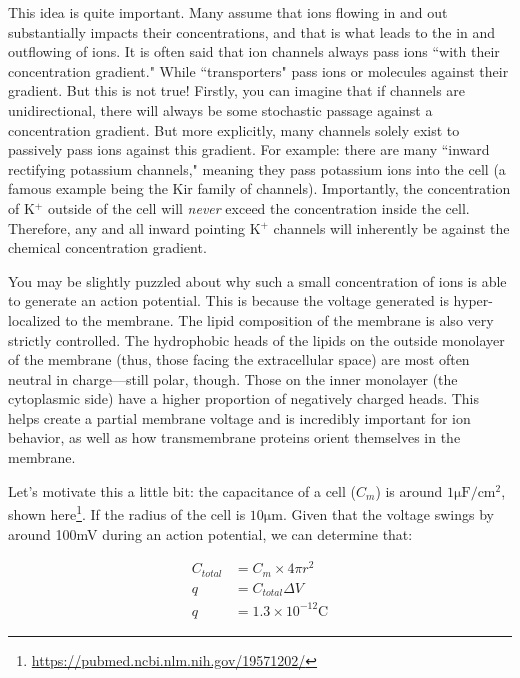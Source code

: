 \documentclass[12pt]{report}
\begin{document}
This idea is quite important. Many assume that ions flowing in and out substantially impacts their concentrations, and that is what leads to the in and outflowing of ions. It is often said that ion channels always pass ions ``with their concentration gradient." While ``transporters" pass ions or molecules against their gradient. But this is not true! Firstly, you can imagine that if channels are unidirectional, there will always be some stochastic passage against a concentration gradient. But more explicitly, many channels solely exist to passively pass ions against this gradient. For example: there are many ``inward rectifying potassium channels," meaning they pass potassium ions into the cell (a famous example being the Kir family of channels). Importantly, the concentration of K$^+$ outside of the cell will \textit{never} exceed the concentration inside the cell. Therefore, any and all inward pointing K$^+$ channels will inherently be against the chemical concentration gradient.\newline

You may be slightly puzzled about why such a small concentration of ions is able to generate an action potential. This is because the voltage generated is hyper-localized to the membrane. The lipid composition of the membrane is also very strictly controlled. The hydrophobic heads of the lipids on the outside monolayer of the membrane (thus, those facing the extracellular space) are most often neutral in charge---still polar, though. Those on the inner monolayer (the cytoplasmic side) have a higher proportion of negatively charged heads. This helps create a partial membrane voltage and is incredibly important for ion behavior, as well as how transmembrane proteins orient themselves in the membrane.\newline

Let's motivate this a little bit: the capacitance of a cell ($C_m$) is around $1\mathrm{\mu F}/\mathrm{cm}^2$, shown here\footnote{\url{https://pubmed.ncbi.nlm.nih.gov/19571202/}}. If the radius of the cell is $10\mathrm{\mu m}$. Given that the voltage swings by around 100mV during an action potential, we can determine that:


\begin{equation} \label{smallchange1}
\begin{split}
C_{total} &= C_m \times 4\pi r^2\\
q &= C_{total}\Delta V \\
q &= 1.3 \times 10^{-12}\mathrm{C}
\end{split}
\end{equation}
\end{document}
